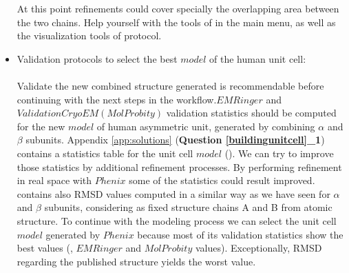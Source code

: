 \begin{itemize}
At this point refinements could cover specially the overlapping area between the two chains. Help yourself with the \coot tools of  in the main menu, as well as the visualization tools of \phenix {} protocol. 
 \item Validation protocols to select the best $model$ of the human  unit cell:\\
 \\Validate the new combined structure generated is recommendable before continuing with the next steps in the workflow.$EMRinger$ and $Validation CryoEM (MolProbity)$ validation statistics should be computed for the new $model$ of human  asymmetric unit, generated by combining  $\alpha$ and $\beta$ subunits. Appendix \ref{app:solutions} (\textbf{Question \ref{buildingunitcell}\_1}) contains a statistics table for the unit cell $model$ (). We can try to improve those statistics by additional refinement processes. By performing refinement in real space with $Phenix$ some of the statistics could result improved.  contains also RMSD values computed in a similar way as we have seen for $\alpha$ and $\beta$ subunits, considering as fixed structure chains A and B from  atomic structure. To continue with the modeling process we can select the unit cell $model$ generated by $Phenix$  because most of its validation statistics show the best values (\ccmask, $EMRinger$  and $MolProbity$ values). Exceptionally, RMSD regarding the published structure yields the worst value.
 
\end{itemize}

